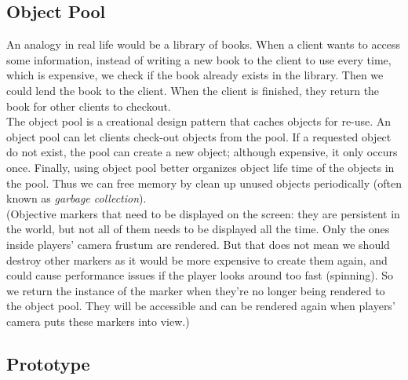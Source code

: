 \iftwocolumns
\begin{multicols}{2}
\fi

\subsection{Object Pool}

An analogy in real life would be a library of books. When a client wants to access some information, instead of writing a new book to the client to use every time, which is expensive, we check if the book already exists in the library. Then we could lend the book to the client. When the client is finished, they return the book for other clients to checkout.\bs
\\
The object pool is a creational design pattern that caches objects for re-use. An object pool can let clients check-out objects from the pool. If a requested object do not exist, the pool can create a new object; although expensive, it only occurs once. Finally, using object pool better organizes object life time of the objects in the pool. Thus we can free memory by clean up unused objects periodically (often known as \textit{garbage collection}).\bs
\\


(Objective markers that need to be displayed on the screen: they are persistent in the world, but not all of them needs to be displayed all the time. Only the ones inside players' camera frustum are rendered. But that does not mean we should destroy other markers as it would be more expensive to create them again, and could cause performance issues if the player looks around too fast (spinning). So we return the instance of the marker when they're no longer being rendered to the object pool. They will be accessible and can be rendered again when players' camera puts these markers into view.)

\subsection{Prototype}


\end{multicols}
